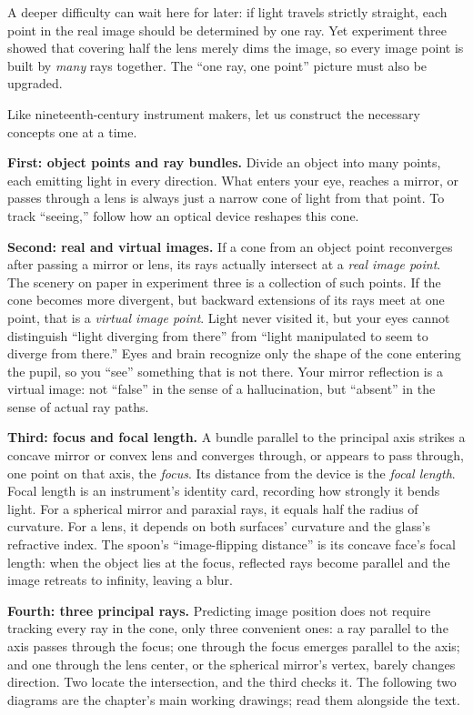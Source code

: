 \begin{mainline}
A deeper difficulty can wait here for later: if light travels strictly straight, each point in the real image should be determined by one ray. Yet experiment three showed that covering half the lens merely dims the image, so every image point is built by \emph{many} rays together. The ``one ray, one point'' picture must also be upgraded.


Like nineteenth-century instrument makers, let us construct the necessary concepts one at a time.

\textbf{First: object points and ray bundles.} Divide an object into many points, each emitting light in every direction. What enters your eye, reaches a mirror, or passes through a lens is always just a narrow cone of light from that point. To track ``seeing,'' follow how an optical device reshapes this cone.

\textbf{Second: real and virtual images.} If a cone from an object point reconverges after passing a mirror or lens, its rays actually intersect at a \emph{real image point}. The scenery on paper in experiment three is a collection of such points. If the cone becomes more divergent, but backward extensions of its rays meet at one point, that is a \emph{virtual image point}. Light never visited it, but your eyes cannot distinguish ``light diverging from there'' from ``light manipulated to seem to diverge from there.'' Eyes and brain recognize only the shape of the cone entering the pupil, so you ``see'' something that is not there. Your mirror reflection is a virtual image: not ``false'' in the sense of a hallucination, but ``absent'' in the sense of actual ray paths.

\textbf{Third: focus and focal length.} A bundle parallel to the principal axis strikes a concave mirror or convex lens and converges through, or appears to pass through, one point on that axis, the \emph{focus}. Its distance from the device is the \emph{focal length}. Focal length is an instrument's identity card, recording how strongly it bends light. For a spherical mirror and paraxial rays, it equals half the radius of curvature. For a lens, it depends on both surfaces' curvature and the glass's refractive index. The spoon's ``image-flipping distance'' is its concave face's focal length: when the object lies at the focus, reflected rays become parallel and the image retreats to infinity, leaving a blur.

\textbf{Fourth: three principal rays.} Predicting image position does not require tracking every ray in the cone, only three convenient ones: a ray parallel to the axis passes through the focus; one through the focus emerges parallel to the axis; and one through the lens center, or the spherical mirror's vertex, barely changes direction. Two locate the intersection, and the third checks it. The following two diagrams are the chapter's main working drawings; read them alongside the text.


\end{mainline}
